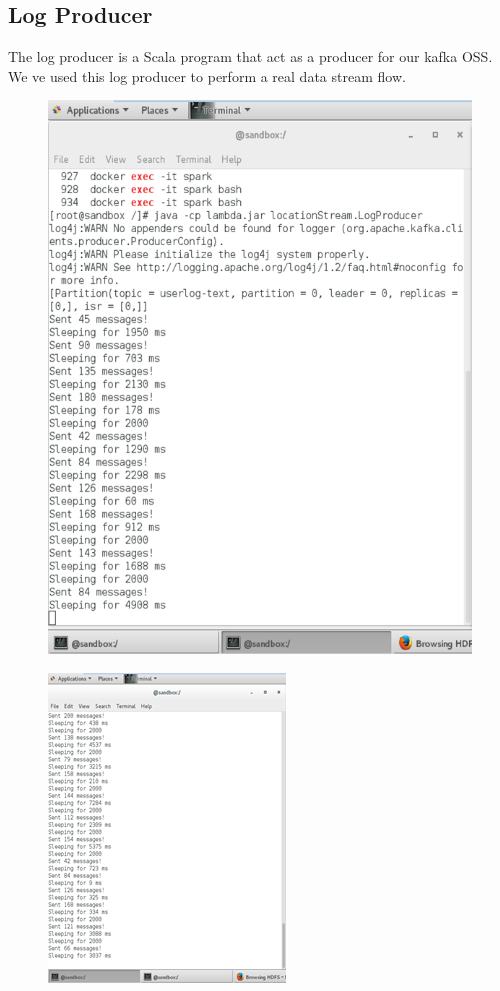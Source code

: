\subsection{Log Producer}
\label{sec:sec01}
The log producer is a Scala program that act as a producer for our kafka OSS. We ve used this log producer to perform
a real data stream flow.
\begin{figure}[h!]
	\centering
	\includegraphics[height=0.3\textheight]{fig01/logProducer}
	\label{fig:FilialesEtClients}
\end{figure}
\begin{figure}[h!]
	\centering
	\includegraphics[height=0.6\textheight]{fig01/logProducer1}
	\label{fig:FilialesEtClients}
\end{figure}

